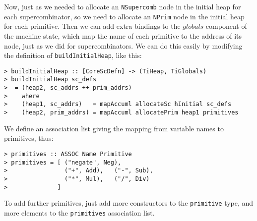Now, just as we needed to allocate an \mbox{\tt NSupercomb} node in the
initial
heap for each supercombinator, so we need to allocate an \mbox{\tt NPrim} node in
the initial heap for each primitive.  Then we can add extra bindings
to the
$globals$ component of the machine state,
which
map the name of each primitive to the address of its node, just as we
did for supercombinators.  We can do this easily by modifying the definition
of \mbox{\tt buildInitialHeap}, like this:
\begin{verbatim}
> buildInitialHeap :: [CoreScDefn] -> (TiHeap, TiGlobals)
> buildInitialHeap sc_defs
>  = (heap2, sc_addrs ++ prim_addrs)
>    where
>    (heap1, sc_addrs)   = mapAccuml allocateSc hInitial sc_defs
>    (heap2, prim_addrs) = mapAccuml allocatePrim heap1 primitives
\end{verbatim}
%
%
\par
We define an association
list giving the mapping from variable names to primitives, thus:
\begin{verbatim}
> primitives :: ASSOC Name Primitive
> primitives = [ ("negate", Neg),
>                ("+", Add),   ("-", Sub),
>                ("*", Mul),   ("/", Div)
>              ]
\end{verbatim}
%
%
To add further primitives, just add more constructors to the
\mbox{\tt primitive} type, and more elements to the \mbox{\tt primitives} association list.

